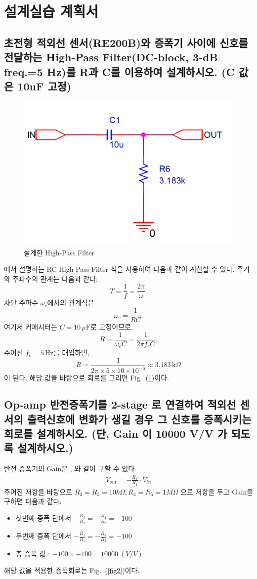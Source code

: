 \documentclass{article}
\begin{document}
\section{설계실습 계획서}
\subsection{초전형 적외선 센서(RE200B)와 증폭기 사이에 신호를 전달하는 High-Pass Filter(DC-block, 3-dB freq.=5 Hz)를 R과 C를 이용하여 설계하시오. (C 값은 10uF 고정)\label{sec1}}
\begin{figure}[H]
    \centering
    \includegraphics[width=0.5\linewidth]{figures/fig1.png}
    \caption{설계한 High-Pass Filter}
    \label{fig1}
\end{figure}
\cite{alexander2023fundamentals}에서 설명하는 RC High-Pass Filter 식을 사용하여 다음과 같이 계산할 수 있다.
주기와 주파수의 관계는 다음과 같다:
\[
    T = \frac{1}{f} = \frac{2\pi}{\omega}.
\]
차단 주파수 $\omega_c$에서의 관계식은
\[
    \omega_c = \frac{1}{RC}.
\]
여기서 커패시터는 $C = 10\,\mu\mathrm{F}$로 고정이므로,
\[
    R = \frac{1}{\omega_c C} = \frac{1}{2\pi f_c C}.
\]
주어진 $f_c = 5\,\mathrm{Hz}$를 대입하면,
\[
    R = \frac{1}{2\pi \times 5 \times 10 \times 10^{-6}}
    \approx 3.183\,\mathrm{k}\Omega
\]
이 된다. 해당 값을 바탕으로 회로를 그리면 Fig.~(\ref{fig1})이다.


\subsection{Op-amp 반전증폭기를 2-stage 로 연결하여 적외선 센서의 출력신호에 변화가 생길 경우 그 신호를 증폭시키는 회로를 설계하시오. (단, Gain 이 10000 V/V 가 되도록 설계하시오.)\label{sec2}}
반전 증폭기의 Gain은 \cite{alexander2023fundamentals}, \cite{ele}와 같이 구할 수 있다.
\begin{align}
    V_{out} = -\frac{R_f}{R_1}\cdot V_{in}
\end{align}
주어진 저항을 바탕으로 $R_2 = R_3 = 10k\Omega, R_4 = R_5 = 1M\Omega$ 으로 저항을 두고 Gain을 구하면 다음과 같다.
\begin{itemize}
    \item 첫번째 증폭 단에서 $-\frac{R_f}{R_1} = -\frac{R_4}{R_2} = -100$
    \item 두번째 증폭 단에서 $-\frac{R_f}{R_1} = -\frac{R_5}{R_3} = -100$
    \item 총 증폭 값 : $-100\times-100 = 10000~(V/V)$
\end{itemize}
해당 값을 적용한 증폭회로는 Fig.~(\ref{fig2})이다.
\end{document}
